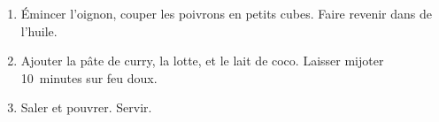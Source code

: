 
\begin{ingredients}
\end{ingredients}


\begin{recipe}
  \begin{enumerate}

  \item Émincer l'oignon, couper les poivrons en petits cubes.  Faire
    revenir dans de l'huile.

  \item Ajouter la pâte de curry, la lotte, et le lait de coco.
    Laisser mijoter 10~minutes sur feu doux.

  \item Saler et pouvrer.  Servir.

  \end{enumerate}
\end{recipe}

